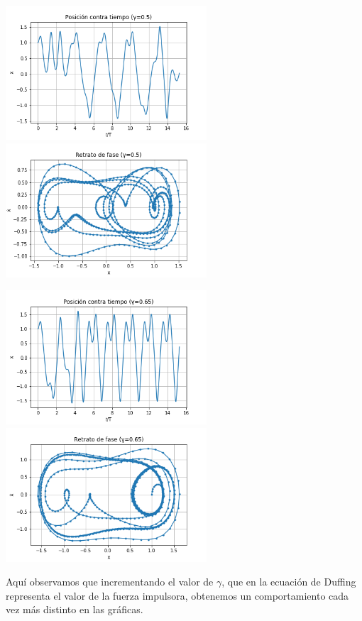 \documentclass[letterpaper,12pt]{article}
\begin{document}
\begin{center}
	\includegraphics[height=5cm]{P5.png} \hspace*{\fill}
    \includegraphics[height=5cm]{R5.png}
\end{center}

\begin{center}
	\includegraphics[height=5cm]{P6.png} \hspace*{\fill}
    \includegraphics[height=5cm]{R6.png}
\end{center}

Aquí observamos que incrementando el valor de $\gamma$, que en la ecuación de Duffing representa el valor de la fuerza impulsora, obtenemos un comportamiento cada vez más distinto en las gráficas.
\end{document}
